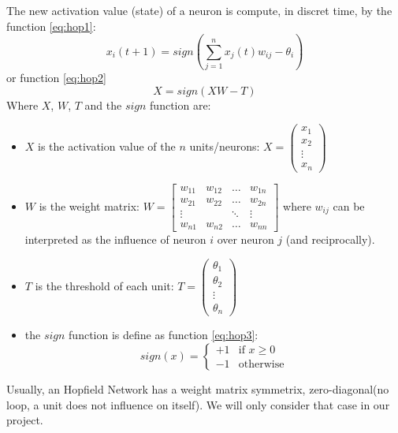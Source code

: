 The new activation value (state) of a neuron is compute, in discret time, by the function \ref{eq:hop1}:
\begin{equation}
\label{eq:hop1}
x_i(t + 1) = sign(\sum_{j = 1}^{n}x_j(t)w_{ij} - \theta_i)
\end{equation}
or function \ref{eq:hop2}\\
\begin{equation}
\label{eq:hop2}
X = sign(XW - T)
\end{equation}
Where $X$, $W$, $T$ and the $sign$ function are:
\begin{itemize}
  \item $X$ is the activation value of the $n$ units/neurons: $X = \left(\begin{array}{c}
x_1\\ 
x_2\\
\vdots \\
x_n
\end{array}\right)$
  \item $W$ is the weight matrix: $W = \begin{bmatrix}
w_{11} & w_{12} & \dots & w_{1n}  \\
w_{21} & w_{22} & \dots & w_{2n} \\
\vdots  &            & \ddots & \vdots \\
w_{n1} & w_{n2} & \dots & w_{nn} 
\end{bmatrix}$ where $w_{ij}$ can be interpreted as the influence of neuron $i$ over neuron $j$ (and reciprocally).
  \item $T$ is the threshold of each unit: $T = \left(\begin{array}{c}
\theta_{1}\\ 
\theta_2\\
\vdots \\
\theta_{n}
\end{array}\right)$
  \item the $sign$ function is define as function \ref{eq:hop3}:
  \begin{equation}
	\label{eq:hop3}
	sign(x) = \begin{cases}
					+1 & \text{if } x \geq 0\\
					-1 & \text{otherwise}
				\end{cases}
  \end{equation}
\end{itemize}

Usually, an Hopfield Network has a weight matrix symmetrix, zero-diagonal(no loop, a unit does not influence on itself). We will only consider that case in our project. 

